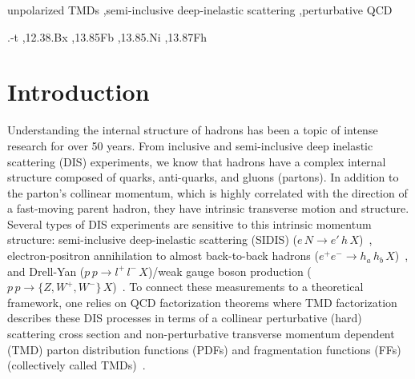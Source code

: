 \documentclass[final,3p,times,onecolumn,sort&compress,hidelinks]{elsarticle}
\newcommand\3[1]{\boldsymbol{#1}}
\begin{document}
\begin{frontmatter}
\begin{keyword}
unpolarized TMDs \sep semi-inclusive deep-inelastic scattering \sep perturbative QCD

.-t \sep 12.38.Bx \sep  13.85Fb \sep 13.85.Ni \sep 13.87Fh


\end{keyword}

\end{frontmatter}


\date{\today}



\section{Introduction}
\label{s:intro}
Understanding the internal structure of hadrons has been a topic of intense research for over 50 years.  From inclusive and semi-inclusive deep inelastic scattering (DIS) experiments, we know that hadrons  have a complex internal structure
composed of quarks, anti-quarks, and gluons (partons). In addition to the parton's  collinear momentum, which is highly correlated  with the direction of a fast-moving parent hadron, they 
have intrinsic transverse motion and structure. Several types of DIS experiments are sensitive to this intrinsic momentum structure: semi-inclusive deep-inelastic scattering (SIDIS) ($e\,N\to e'\,h\,X$)~\cite{Kotzinian:1994dv}, electron-positron annihilation to almost back-to-back hadrons ($e^+e^-\to h_a\,h_b\,X$)~\cite{Boer:1997mf}, and Drell-Yan ($p\,p\to l^+\,l^-\,X$)/weak gauge boson production ($p\,p\to \{Z, W^+, W^-\}\,X$)~\cite{Tangerman:1994eh}. To connect these measurements  to a theoretical framework, 
one relies on QCD factorization theorems where
TMD factorization~\cite{Collins:1981uw,Ji:2004wu,Collins:2011zzd}
describes these DIS processes in terms of  a collinear perturbative (hard) scattering cross section and  non-perturbative 
transverse momentum dependent (TMD)
 parton distribution functions (PDFs) and fragmentation functions (FFs) (collectively called TMDs)~\cite{Kotzinian:1994dv,Mulders:1995dh,Boer:1997nt}. 

 
\end{document}
